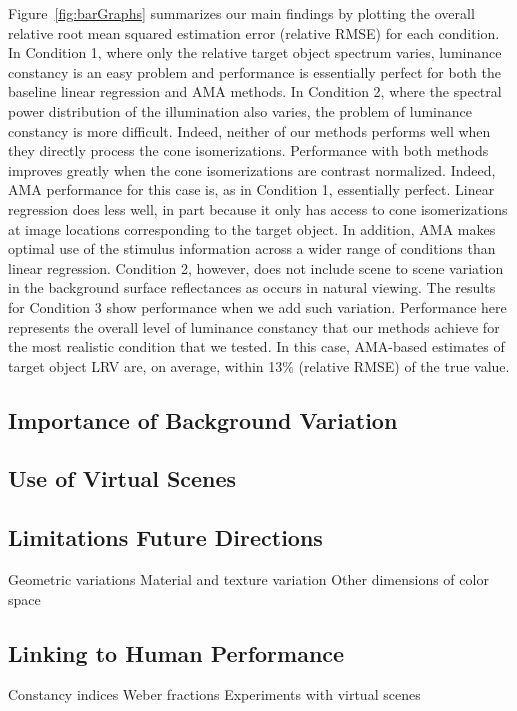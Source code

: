 \documentclass{jov}
\begin{document}
Figure~\ref{fig:barGraphs} summarizes our main findings by plotting the overall relative root mean squared estimation error (relative RMSE) for each condition. 
In Condition 1, where only the relative target object spectrum varies, luminance constancy is an easy problem and performance is essentially perfect for both the baseline linear regression and AMA methods.
In Condition 2, where the spectral power distribution of the illumination also varies, the problem of luminance constancy is more difficult.
Indeed, neither of our methods performs well when they directly process the cone isomerizations.
Performance with both methods improves greatly when the cone isomerizations are contrast normalized. 
Indeed, AMA performance for this case is, as in Condition 1, essentially perfect.
Linear regression does less well, in part because it only has access to cone isomerizations at image locations
corresponding to the target object.
In addition, AMA makes optimal use of the stimulus information across a wider range
of conditions than linear regression.
Condition 2, however, does not include scene to scene variation in the background surface reflectances
as occurs in natural viewing.
The results for Condition 3 show performance when we add such variation.
Performance here represents the overall level of luminance constancy that our methods achieve for the
most realistic condition that we tested.
In this case, AMA-based estimates of target object LRV are, on average, within 13\% (relative RMSE) of the true value.

\subsection{Importance of Background Variation}

\subsection{Use of Virtual Scenes}

\subsection{Limitations Future Directions}
Geometric variations
Material and texture variation
Other dimensions of color space

\subsection{Linking to Human Performance}
Constancy indices
Weber fractions
Experiments with virtual scenes
\end{document}
